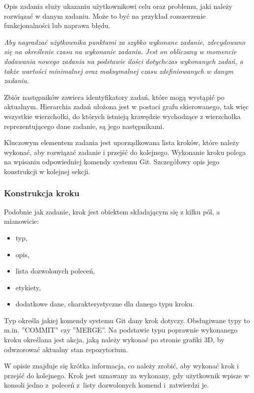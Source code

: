\documentclass[12pt,a4paper,polish,thesis]{dcsbook}
\begin{document}
{	Opis zadania służy ukazaniu użytkownikowi celu oraz problemu, jaki należy rozwiązać w danym zadaniu. Może to być na przykład rozszerzenie funkcjonalności lub naprawa błędu.

	\textit{Aby nagradzać użytkownika punktami za szybko wykonane zadanie, zdecydowano się na określenie czasu na wykonanie zadania. Jest on obliczany w momencie dodawania nowego zadania na podstawie ilości dotychczas wykonanych zadań, a także wartości minimalnej oraz maksymalnej czasu zdefiniowanych w danym zadaniu.}

	Zbiór następników zawiera identyfikatory zadań, które mogą wystąpić po aktualnym. Hierarchia zadań ułożona jest w postaci grafu skierowanego, tak więc wszystkie wierzchołki, do których istnieją krawędzie wychodzące z wierzchołka reprezentującego dane zadanie, są jego następnikami.

	Kluczowym elementem zadania jest uporządkowana lista kroków, które należy wykonać, aby rozwiązać zadanie i przejść do kolejnego. Wykonanie kroku polega na wpisaniu odpowiedniej komendy systemu Git. Szczegółowy opis jego konstrukcji w kolejnej sekcji.


	\subsubsection{Konstrukcja kroku}

	Podobnie jak zadanie, krok jest obiektem składającym się z kilku pól, a mianowicie:
	\begin{itemize}
		\item typ,
		\item opis,
		\item lista dozwolonych poleceń,
		\item etykiety,
		\item dodatkowe dane, charakterystyczne dla danego typu kroku.
	\end{itemize}

	Typ określa jakiej komendy systemu Git dany krok dotyczy. Obsługiwane typy to m.in. ''COMMIT'' czy ''MERGE''. Na podstawie typu poprawnie wykonanego kroku określana jest akcja, jaką należy wykonać po stronie grafiki 3D, by odwzorować aktualny stan repozytorium.

	W opisie znajduje się krótka informacja, co należy zrobić, aby wykonać krok i przejść do kolejnego. Krok jest uznawany za wykonany, gdy użytkownik wpisze w konsoli jedno z~poleceń z~listy dozwolonych komend i~zatwierdzi je.

}
\end{document}
